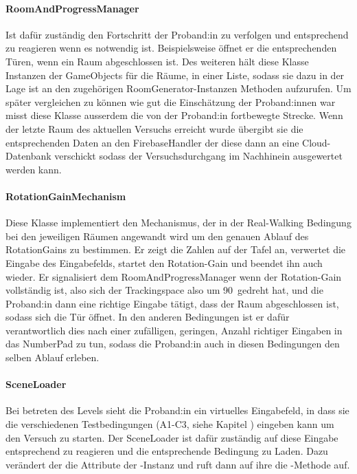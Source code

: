 \begin{multicols*}{2}
    \paragraph{RoomAndProgressManager}
    Ist dafür zuständig den Fortschritt der Proband:in zu verfolgen und entsprechend zu reagieren wenn es notwendig ist. Beispielsweise öffnet er die entsprechenden Türen, wenn ein Raum abgeschlossen ist.
    Des weiteren hält diese Klasse Instanzen der GameObjects für die Räume, in einer Liste, sodass sie dazu in der Lage ist an den zugehörigen RoomGenerator-Instanzen Methoden aufzurufen. Um später vergleichen zu können wie gut die Einschätzung der Proband:innen war misst diese Klasse ausserdem die von der Proband:in fortbewegte Strecke. Wenn der letzte Raum des aktuellen Versuchs erreicht wurde übergibt sie die entsprechenden Daten an den FirebaseHandler der diese dann an eine Cloud-Datenbank verschickt sodass der Versuchsdurchgang im Nachhinein ausgewertet werden kann.


    \paragraph{RotationGainMechanism}
    Diese Klasse implementiert den Mechanismus, der in der Real-Walking Bedingung bei den jeweiligen Räumen angewandt wird um den genauen Ablauf des RotationGains zu bestimmen. Er zeigt die Zahlen auf der Tafel an, verwertet die Eingabe des Eingabefelds, startet den Rotation-Gain und beendet ihn auch wieder. Er signalisiert dem RoomAndProgressManager wenn der Rotation-Gain vollständig ist, also sich der Trackingspace also um
    90\textdegree\
    gedreht hat, und die Proband:in dann eine richtige Eingabe tätigt, dass der Raum abgeschlossen ist, sodass sich die Tür öffnet. In den anderen Bedingungen ist er dafür verantwortlich dies nach einer zufälligen, geringen, Anzahl richtiger Eingaben in das NumberPad zu tun, sodass die Proband:in auch in diesen Bedingungen den selben Ablauf erleben.

    \paragraph{SceneLoader}
    Bei betreten des Levels sieht die Proband:in ein virtuelles Eingabefeld, in dass sie die verschiedenen Testbedingungen (A1-C3, siehe Kapitel
    ) eingeben kann um den Versuch zu starten. Der SceneLoader ist dafür zuständig auf diese Eingabe entsprechend zu reagieren und die entsprechende Bedingung zu Laden. Dazu verändert der die Attribute der -Instanz und ruft dann auf ihre die -Methode auf.


\end{multicols*}
